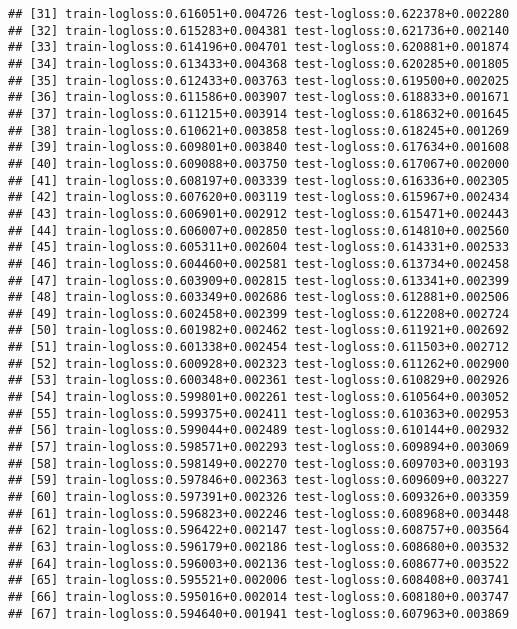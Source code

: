 \documentclass[
]{article}
\begin{document}
\begin{verbatim}
## [31] train-logloss:0.616051+0.004726 test-logloss:0.622378+0.002280 
## [32] train-logloss:0.615283+0.004381 test-logloss:0.621736+0.002140 
## [33] train-logloss:0.614196+0.004701 test-logloss:0.620881+0.001874 
## [34] train-logloss:0.613433+0.004368 test-logloss:0.620285+0.001805 
## [35] train-logloss:0.612433+0.003763 test-logloss:0.619500+0.002025 
## [36] train-logloss:0.611586+0.003907 test-logloss:0.618833+0.001671 
## [37] train-logloss:0.611215+0.003914 test-logloss:0.618632+0.001645 
## [38] train-logloss:0.610621+0.003858 test-logloss:0.618245+0.001269 
## [39] train-logloss:0.609801+0.003840 test-logloss:0.617634+0.001608 
## [40] train-logloss:0.609088+0.003750 test-logloss:0.617067+0.002000 
## [41] train-logloss:0.608197+0.003339 test-logloss:0.616336+0.002305 
## [42] train-logloss:0.607620+0.003119 test-logloss:0.615967+0.002434 
## [43] train-logloss:0.606901+0.002912 test-logloss:0.615471+0.002443 
## [44] train-logloss:0.606007+0.002850 test-logloss:0.614810+0.002560 
## [45] train-logloss:0.605311+0.002604 test-logloss:0.614331+0.002533 
## [46] train-logloss:0.604460+0.002581 test-logloss:0.613734+0.002458 
## [47] train-logloss:0.603909+0.002815 test-logloss:0.613341+0.002399 
## [48] train-logloss:0.603349+0.002686 test-logloss:0.612881+0.002506 
## [49] train-logloss:0.602458+0.002399 test-logloss:0.612208+0.002724 
## [50] train-logloss:0.601982+0.002462 test-logloss:0.611921+0.002692 
## [51] train-logloss:0.601338+0.002454 test-logloss:0.611503+0.002712 
## [52] train-logloss:0.600928+0.002323 test-logloss:0.611262+0.002900 
## [53] train-logloss:0.600348+0.002361 test-logloss:0.610829+0.002926 
## [54] train-logloss:0.599801+0.002261 test-logloss:0.610564+0.003052 
## [55] train-logloss:0.599375+0.002411 test-logloss:0.610363+0.002953 
## [56] train-logloss:0.599044+0.002489 test-logloss:0.610144+0.002932 
## [57] train-logloss:0.598571+0.002293 test-logloss:0.609894+0.003069 
## [58] train-logloss:0.598149+0.002270 test-logloss:0.609703+0.003193 
## [59] train-logloss:0.597846+0.002363 test-logloss:0.609609+0.003227 
## [60] train-logloss:0.597391+0.002326 test-logloss:0.609326+0.003359 
## [61] train-logloss:0.596823+0.002246 test-logloss:0.608968+0.003448 
## [62] train-logloss:0.596422+0.002147 test-logloss:0.608757+0.003564 
## [63] train-logloss:0.596179+0.002186 test-logloss:0.608680+0.003532 
## [64] train-logloss:0.596003+0.002136 test-logloss:0.608677+0.003522 
## [65] train-logloss:0.595521+0.002006 test-logloss:0.608408+0.003741 
## [66] train-logloss:0.595016+0.002014 test-logloss:0.608180+0.003747 
## [67] train-logloss:0.594640+0.001941 test-logloss:0.607963+0.003869 

\end{verbatim}
\end{document}
